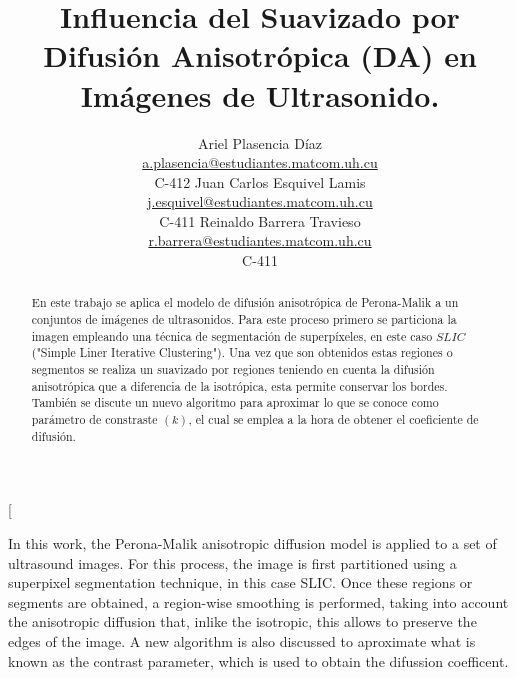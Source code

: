 \documentclass[a4paper,10pt,twocolumn]{article}
\title{Influencia del Suavizado por Difusi\'on Anisotr\'opica (DA) en Im\'agenes de Ultrasonido.}
\author{Ariel Plasencia D\'iaz\\
\name  \email \href{mailto:a.plasencia@estudiantes.matcom.uh.cu}{a.plasencia@estudiantes.matcom.uh.cu}
    \\ \addr C-412  \AND
Juan Carlos Esquivel Lamis \\
\name   \email \href{mailto:j.esquivel@estudiantes.matcom.uh.cu}{j.esquivel@estudiantes.matcom.uh.cu}
    \\ \addr C-411  \AND
Reinaldo Barrera Travieso\\
\name  \email \href{mailto:r.barrera@estudiantes.matcom.uh.cu}{r.barrera@estudiantes.matcom.uh.cu}
    \\ \addr C-411 }
\begin{document}
\twocolumn[

\maketitle


\begin{abstract}

En este trabajo se aplica el modelo de difusi\'on anisotr\'opica de Perona-Malik a un conjuntos de im\'agenes de ultrasonidos. Para este proceso primero se particiona la imagen empleando una t\'ecnica de segmentaci\'on de superp\'ixeles, en este caso $SLIC$("Simple Liner Iterative Clustering"). Una vez que son obtenidos estas regiones o segmentos se realiza un suavizado por regiones teniendo en cuenta la difusi\'on anisotr\'opica que a diferencia de la isotr\'opica, esta permite conservar los bordes. Tambi\'en se discute un nuevo algoritmo para aproximar lo que se conoce como par\'ametro de constraste $(k)$, el cual se emplea a la hora de obtener el coeficiente de difusi\'on.

\end{abstract}

\vspace{0.5cm}
\begin{enabstract}
In this work, the Perona-Malik anisotropic diffusion model is applied to a set of ultrasound images. For this process, the image is first partitioned using a superpixel segmentation technique, in this case SLIC. Once these regions or segments are obtained, a region-wise smoothing is performed, taking into account the anisotropic diffusion that, inlike the isotropic, this allows to preserve the edges of the image. A new algorithm is also discussed to aproximate what is known as the contrast parameter, which is used to obtain the difussion coefficent.
\end{enabstract}
\end{document}
